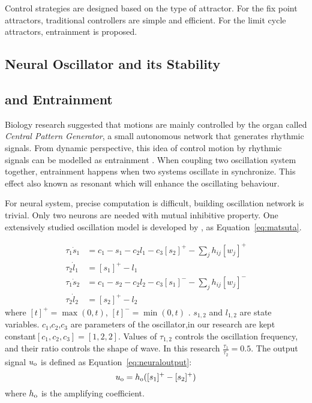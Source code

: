 Control strategies are designed based on the type of attractor.
For the fix point attractors, traditional \pd controllers are simple and efficient.
For the limit cycle attractors,  entrainment is proposed.


\subsection{Neural Oscillator and its Stability}


\subsection{\cpg and Entrainment}
Biology research suggested that motions are mainly controlled by the organ called \emph{Central Pattern Generator}, a small autonomous network that generates rhythmic signals.
From dynamic perspective, this idea of control motion by rhythmic signals can be modelled as entrainment \citep{Gonz'alez-Miranda2004}.
When coupling two oscillation system together, entrainment happens when two systems oscillate in synchronize. 
This effect also known as resonant which will enhance the oscillating behaviour. 


For neural system, precise computation is difficult,  building oscillation network is trivial. 
Only two neurons are needed with mutual inhibitive property.
One extensively studied oscillation model is developed by \citet{neurooscillation}, as Equation~\ref{eq:matsuta}.

\begin{align}
\tau_{1} \dot{s}_{1}&=c_1-s_{1}-c_2 l_{1}-c_3 [s_{2}]^{+}-\sum_{j}h_{ij}[w_{j}]^{+} \nonumber\\
\tau_{2} \dot{l}_{1}&=[s_{1}]^{+}-l_{1} \nonumber\\
\tau_{1} \dot{s}_{2}&=c_1-s_{2}-c_2 l_{2}-c_3 [s_{1}]^{-}-\sum_{j}h_{ij}[w_{j}]^{-} \nonumber\\
\tau_{2} \dot{l}_{2}&=[s_{2}]^{+}-l_{2}
\label{eq:matsuta}
\end{align}
where $[t]^{+}=\max(0,t)$, $[t]^{-}=\min(0,t)$ .
$s_{1,2}$ and $l_{1,2}$ are state variables.
$c_1$,$c_2$,$c_3$ are parameters of the oscillator,in our research are kept constant$[c_1,c_2,c_3]=[1,2,2]$.
Values of $\tau_{1,2}$ controls the oscillation frequency, and their ratio controls the shape of wave.
In this research $\frac{\tau_{1}}{\tau_{2}}=0.5$.
The output signal $u_{\mathrm{o}}$ is defined as Equation~\ref{eq:neuraloutput}:
\begin{equation}
u_{\mathrm{o}}=h_{\mathrm{o}}([s_{1}]^{+}-[s_{2}]^{+})
\label{eq:neuraloutput}
\end{equation}
where $h_{\mathrm{o}}$ is the amplifying coefficient.

